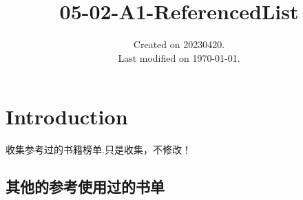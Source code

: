 \documentclass[UTF8]{../../RepresentationUniverse}
\begin{document}
\title{05-02-A1-ReferencedList}
\date{Created on 20230420.\\   Last modified on \today.}
\maketitle
\tableofcontents


\chapter{Introduction}

收集参考过的书籍榜单.只是收集，不修改！




\section{其他的参考使用过的书单}
\end{document}

